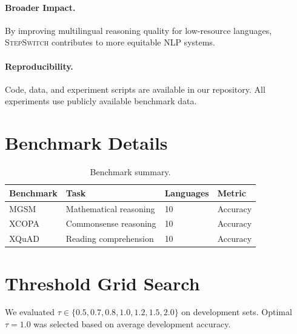 \documentclass{article}
\newcommand{\stepswitch}{\textsc{StepSwitch}}
\begin{document}
\paragraph{Broader Impact.} By improving multilingual reasoning quality for low-resource languages, \stepswitch{} contributes to more equitable NLP systems.

\paragraph{Reproducibility.} Code, data, and experiment scripts are available in our repository. All experiments use publicly available benchmark data.




\appendix

\section{Benchmark Details}
\label{app:benchmarks}

\begin{table}[h]
\centering
\caption{Benchmark summary.}
\label{tab:benchmarks}
\begin{tabular}{llll}
\toprule
Benchmark & Task & Languages & Metric \\
\midrule
MGSM & Mathematical reasoning & 10 & Accuracy \\
XCOPA & Commonsense reasoning & 10 & Accuracy \\
XQuAD & Reading comprehension & 10 & Accuracy \\
\bottomrule
\end{tabular}
\end{table}

\section{Threshold Grid Search}
\label{app:threshold}

We evaluated $\tau \in \{0.5, 0.7, 0.8, 1.0, 1.2, 1.5, 2.0\}$ on development sets. Optimal $\tau=1.0$ was selected based on average development accuracy.
\end{document}
